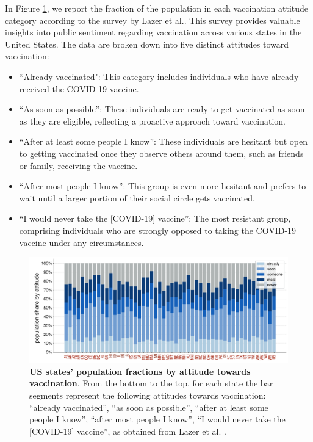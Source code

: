 \documentclass[
 reprint,
 amsmath,amssymb,
 aps,
]{revtex4-2}
\begin{document}
In Figure \ref{fig:supp_threshold}, we report the fraction of the population in each vaccination attitude category according to the survey by Lazer et al.\cite{lazer2021covid}. This survey provides valuable insights into public sentiment regarding vaccination across various states in the United States. The data are broken down into five distinct attitudes toward vaccination:
\begin{itemize}
    \item ``Already vaccinated": This category includes individuals who have already received the COVID-19 vaccine.
    
    \item ``As soon as possible'': These individuals are ready to get vaccinated as soon as they are eligible, reflecting a proactive approach toward vaccination.
    
    \item ``After at least some people I know'': These individuals are hesitant but open to getting vaccinated once they observe others around them, such as friends or family, receiving the vaccine.
    
    \item ``After most people I know'': This group is even more hesitant and prefers to wait until a larger portion of their social circle gets vaccinated.

    \item ``I would never take the [COVID-19] vaccine'': The most resistant group, comprising individuals who are strongly opposed to taking the COVID-19 vaccine under any circumstances.
\end{itemize}

\begin{figure}
\centering
\includegraphics[width=\textwidth]{figure6.pdf}
\caption{\label{fig:supp_threshold} \textbf{US states' population fractions by attitude towards vaccination}. From the bottom to the top, for each state the bar segments represent the following attitudes towards vaccination: ``already vaccinated'', ``as soon as possible'', ``after at least some people I know'', ``after most people I know'', ``I would never take the [COVID-19] vaccine'', as obtained from Lazer et al. \cite{lazer2021covid}.}
\end{figure}
\end{document}
